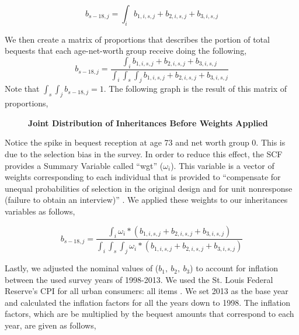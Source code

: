 \documentclass[letterpaper,12pt]{article}
\newcommand{\quotes}[1]{``#1''}
\theoremstyle{definition}
\begin{document}
\begin{spacing}{1.5}
\[ b_{s-18,j} = \int_i b_{1,i,s,j} + b_{2,i,s,j} +b_{3,i,s,j}\]
           

   We then create a matrix of proportions that describes the portion of total bequests that each age-net-worth group receive doing the following,
   \[b_{s-18,j} = \frac{\int_i b_{1,i,s,j} + b_{2,i,s,j} +b_{3,i,s,j}}{\int_i \int_s \int_j b_{1,i,s,j} + b_{2,i,s,j} +b_{3,i,s,j}}\]
  Note that $\int_s \int_j b_{s-18,j} = 1$. The following graph is the result of this matrix of proportions, 

  \begin{figure}[htbp]\centering \captionsetup{width=5.5in}
      \caption{\label{Weightfig}\textbf{Joint Distribution of Inheritances Before Weights Applied}}
    \end{figure}
  \newpage

  Notice the spike in bequest reception at age 73 and net worth group 0. This is due to the selection bias in the survey. In order to reduce this effect, the SCF provides a Summary Variable called \quotes{wgt} ($\omega_i$). This variable is a vector of weights corresponding to each individual that is provided to \quotes{compensate for unequal probabilities of selection in the original design and for unit nonresponse (failure to obtain an interview)} \citet{FEDweight}. We applied these weights to our inheritances variables as follows,

  \[b_{s-18,j} = \frac{\int_i \omega_i *(b_{1,i,s,j} + b_{2,i,s,j} +b_{3,i,s,j})}{\int_i \int_s \int_j \omega_i *(b_{1,i,s,j} + b_{2,i,s,j} +b_{3,i,s,j})}\]




  Lastly, we adjusted the nominal values of ($b_1, ~ b_2,~b_3$) to account for inflation between the used survey years of 1998-2013. We used the St. Louis Federal Reserve's CPI for all urban consumers: all items \citet{StFed} . We set 2013 as the base year and calculated the inflation factors for all the years down to 1998. The inflation factors, which are be multiplied by the bequest amounts that correspond to each year, are given as follows,


\end{spacing}
\end{document}
